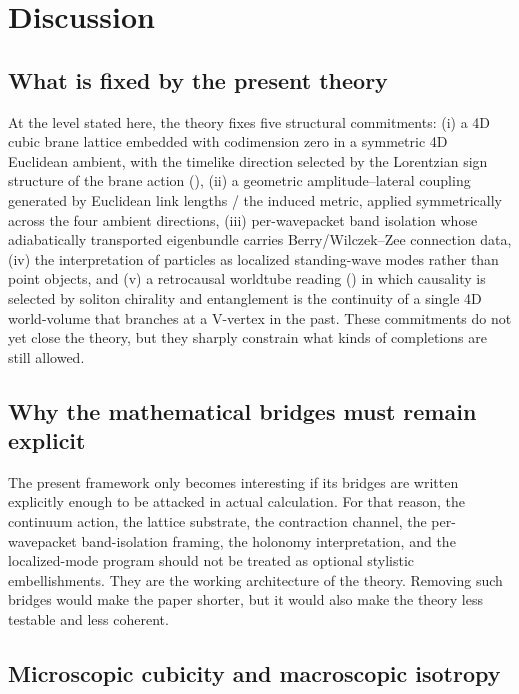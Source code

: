 \section{Discussion}
\label{sec:discussion}

\subsection{What is fixed by the present theory}

At the level stated here, the theory fixes five structural commitments:
(i) a 4D cubic brane lattice embedded with codimension zero in a symmetric 4D Euclidean ambient, with the timelike direction selected by the Lorentzian sign structure of the brane action (),
(ii) a geometric amplitude--lateral coupling generated by Euclidean link lengths / the induced metric, applied symmetrically across the four ambient directions,
(iii) per-wavepacket band isolation whose adiabatically transported eigenbundle carries Berry/Wilczek--Zee connection data,
(iv) the interpretation of particles as localized standing-wave modes rather than point objects, and
(v) a retrocausal worldtube reading () in which causality is selected by soliton chirality and entanglement is the continuity of a single 4D world-volume that branches at a V-vertex in the past.
These commitments do not yet close the theory, but they sharply constrain what kinds of completions are still allowed.

\subsection{Why the mathematical bridges must remain explicit}

The present framework only becomes interesting if its bridges are written explicitly enough to be attacked in actual
calculation.
For that reason, the continuum action, the lattice substrate, the contraction channel, the per-wavepacket band-isolation
framing, the holonomy interpretation, and the localized-mode program should not be treated as optional stylistic
embellishments.
They are the working architecture of the theory.
Removing such bridges would make the paper shorter, but it would also make the theory less testable and less coherent.

\subsection{Microscopic cubicity and macroscopic isotropy}
\label{subsec:discussion-lattice}

